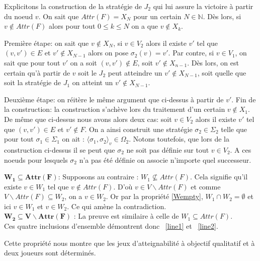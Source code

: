 \begin{demonstration}
		Explicitons la construction de la stratégie de $J_2$ qui lui assure la victoire à partir du noeud $v$. On sait que $Attr(F) = X_N$ pour un certain $N \in \mathbb{N}$. Dès lors, si $v \notin Attr(F)$ alors pour tout $ 0 \leq k \leq N$ on a que $v \notin X_k$.
		
Première étape: on sait que $v \notin X_N$, si $v \in V_2$ alors il existe $v'$ tel que $(v,v') \in E$ et $v' \notin X_{N-1}$ alors on pose $\sigma_2(v) = v'$. Par contre, si $v \in V_1$, on sait que pour tout $v'$ on a soit $(v,v') \notin E$, soit $v' \notin X_{n-1}$. Dès lors, on est certain qu'à partir de $v$ soit le $J_2$ peut atteindre un $v' \notin X_{N-1}$, soit quelle que soit la stratégie de $J_1$ on atteint un $v' \notin X_{N-1}$. 

Deuxième étape: on réitère le même argument que ci-dessus à partir de $v'$.
Fin de la construction: la construction s'achève lors du traitement d'un certain $v \notin X_1$. De même que ci-dessus nous avons alors deux cas: soit $v \in V_2$ alors il existe $v'$ tel que $(v,v') \in E$ et $v' \notin F$. On a ainsi construit une stratégie $\sigma_2 \in \Sigma_2$ telle que pour tout $\sigma_1 \in \Sigma_1$ on ait : $\langle \sigma_1, \sigma_2 \rangle_v \in \Omega_2.$ Notons toutefois, que lors de la construction ci-dessus il se peut que $\sigma_2$ ne soit pas définie sur tout $v\in V_2$. A ces noeuds pour lesquels $\sigma_2$ n'a pas été définie on associe n'importe quel successeur. 
		
		\noindent $\mathbf{W_{1} \subseteq Attr(F)}$: Supposons au contraire : $W_{1} \not\subseteq Attr(F)$. Cela signifie qu'il existe $v \in W_{1}$ tel que $v \notin Attr(F)$. D'où $v \in V\backslash Attr(F)$ et comme $V \backslash Attr(F) \subseteq W_{2}$, on a $v \in W_{2}$. Or par la propriété \ref{Wempty}, $W_{1} \cap W_{2} = \emptyset $ et ici $v \in W_{1}$ et $v \in W_{2}$. Ce qui amène la contradiction.\\
		
		\noindent $\mathbf{W_{2} \subseteq V\backslash Attr(F)}$ : La preuve est similaire à celle de $W_{1} \subseteq Attr(F)$.\\
		
		Ces quatre inclusions d'ensemble démontrent donc ~\eqref{line1} et ~\eqref{line2}.
	\end{demonstration}
	\begin{rem}
		Cette propriété nous montre que les jeux d'atteignabilité à objectif qualitatif et à deux joueurs sont déterminés.
	\end{rem}
	

